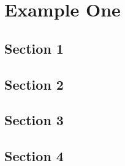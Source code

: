 \pagestyle{fancy}
\renewcommand{\chaptermark}[1]{\markboth{\MakeUppercase{Appendix~\thechapter. #1 }}{}}
\renewcommand{\sectionmark}[1]{\markright{\thechapter.\thesection~ #1}}
\fancyhf{}
\fancyhead[RO]{\itshape\rightmark}
\fancyhead[LE]{\itshape\leftmark}
\fancyfoot[RO]{\thepage}
\fancyfoot[LE]{\thepage}
\renewcommand{\headrulewidth}{0.5pt}
\renewcommand{\footrulewidth}{0pt}

\cleardoublepage
\chapter{Example One}

\section{Section 1}
\blindmathpaper
\section{Section 2}
\blindmathpaper
\section{Section 3}
\blindmathpaper
\section{Section 4}
\blindmathpaper